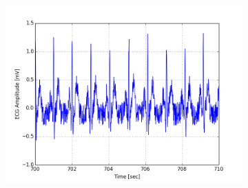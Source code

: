 \documentclass[paper=a4, fontsize=11pt]{scrartcl}
\numberwithin{equation}{section}		%
\numberwithin{figure}{section}			%
\numberwithin{table}{section}		    %
\begin{document}
\begin{appendices}
\begin{figure}[H]
\begin{subfigure}[b]{0.3\textwidth}
		\includegraphics[width=\textwidth]{sim/ecg_24}
	\end{subfigure}
\end{figure}


\end{appendices}
\end{document}
